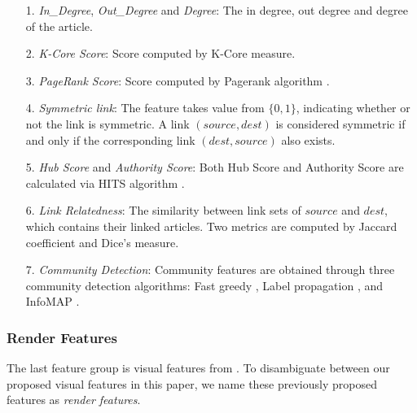 \begin{itemize}

    \item[1.] \emph{In\_Degree}, \emph{Out\_Degree} and \emph{Degree}: The in degree, out degree and degree of the article.

    \item[2.] \emph{K-Core Score}: Score computed by K-Core measure.

    \item[3.] \emph{PageRank Score}: Score computed by Pagerank algorithm \cite{brin1998anatomy}.

    \item[4.] \emph{Symmetric link}: The feature takes value from $\{0,1\}$, indicating whether or not the link is symmetric. A link $(source, dest)$ is considered symmetric if and only if the corresponding link $(dest, source)$ also exists. 

    \item[5.] \emph{Hub Score} and \emph{Authority Score}: Both Hub Score and Authority Score are calculated via HITS algorithm \cite{kleinberg1998authoritative}.

    \item[6.] \emph{Link Relatedness}: The similarity between link sets of $source$ and $dest$, which contains their linked articles. Two metrics are computed by Jaccard coefficient and Dice's measure.

    \item[7.] \emph{Community Detection}: Community features are obtained through three community detection algorithms: Fast greedy \cite{clauset2004finding}, Label propagation \cite{raghavan2007near}, and InfoMAP \cite{rosvall2009map}.

\end{itemize}

\subsubsection{Render Features} \label{render_features}

The last feature group is visual features from \cite{dimitrov2017makes}. To disambiguate between our proposed visual features in this paper, we name these previously proposed features as \emph{render features}.

